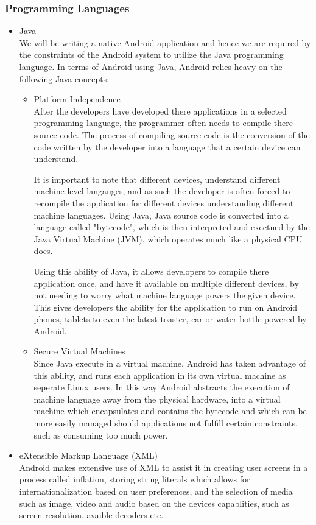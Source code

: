 \documentclass[a4paper,10pt]{article}
\begin{document}
\subsubsection{Programming Languages}
	\begin{itemize}
		\item Java\\
			We will be writing a native Android application and hence we are required by the constraints of the Android system to utilize the Java programming language. In terms of Android using Java, Android relies heavy on the following Java concepts:
			\begin{itemize}
				\item Platform Independence\\
					After the developers have developed there applications in a selected programming language, the programmer often needs to compile there source code. The process of compiling source code is the conversion of the code written by the developer into a language that a certain device can understand. 
					
					It is important to note that different devices, understand different machine level langauges, and as such the developer is often forced to recompile the application for different devices understanding different machine languages. Using Java, Java source code is converted into a language called "bytecode", which is then interpreted and exectued by the Java Virtual Machine (JVM), which operates much like a physical CPU does.
					
					Using this ability of Java, it allows developers to compile there application once, and have it available on multiple different devices, by not needing to worry what machine language powers the given device. This gives developers the ability for the application to run on Android phones, tablets to even the latest toaster, car or water-bottle powered by Android.
					
				\item Secure Virtual Machines\\
					Since Java execute in a virtual machine, Android has taken advantage of this ability, and runs each application in its own virtual machine as seperate Linux users. In this way Android abstracts the execution of machine language away from the physical hardware, into a virtual machine which encapsulates and contains the bytecode and which can be more easily managed should applications not fulfill certain constraints, such as consuming too much power.
				\end{itemize}
		\item eXtensible Markup Language (XML)\\
			Android makes extensive use of XML to assist it in creating user screens in a process called inflation, storing string literals which allows for internationalization based on user preferences, and the selection of media such as image, video and audio based on the devices capablities, such as screen resolution, avaible decoders etc.
	\end{itemize}
	
\end{document}
